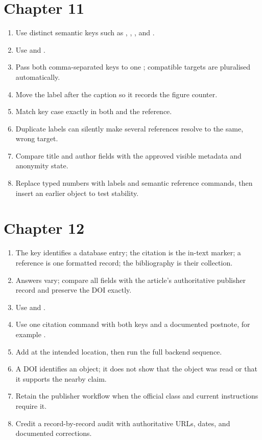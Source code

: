 \section*{Chapter 11}
\begin{enumerate}[label=11.\arabic*,leftmargin=2.4em,itemsep=0.45em]
  \item Use distinct semantic keys such as ,
        , , and .
  \item Use  and
        .
  \item Pass both comma-separated keys to one ; compatible targets are
        pluralised automatically.
  \item Move the label after the caption so it records the figure counter.
  \item Match key case exactly in both  and the reference.
  \item Duplicate labels can silently make several references resolve to the
        same, wrong target.
  \item Compare  title and author fields with the approved visible
        metadata and anonymity state.
  \item Replace typed numbers with labels and semantic reference commands, then
        insert an earlier object to test stability.
\end{enumerate}

\section*{Chapter 12}
\begin{enumerate}[label=12.\arabic*,leftmargin=2.4em,itemsep=0.45em]
  \item The key identifies a database entry; the citation is the in-text marker;
        a reference is one formatted record; the bibliography is their collection.
  \item Answers vary; compare all fields with the article's authoritative
        publisher record and preserve the DOI exactly.
  \item Use  and .
  \item Use one citation command with both keys and a documented postnote, for
        example .
  \item Add  at the intended location, then run the full
        backend sequence.
  \item A DOI identifies an object; it does not show that the object was read or
        that it supports the nearby claim.
  \item Retain the publisher workflow when the official class and current
        instructions require it.
  \item Credit a record-by-record audit with authoritative URLs, dates, and
        documented corrections.
\end{enumerate}


